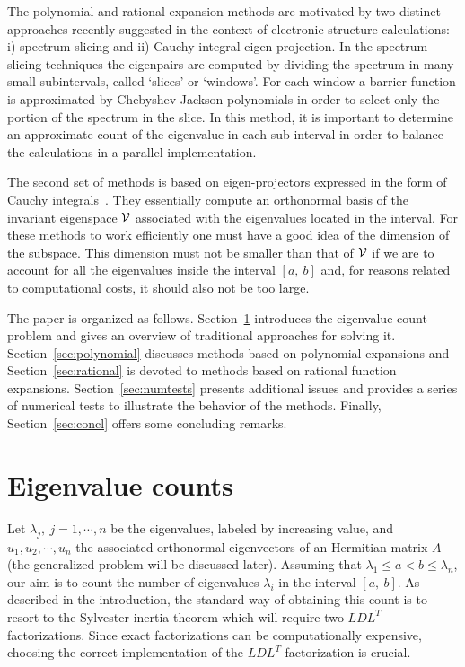 \documentclass[12pt]{article}		\usepackage{tabls,multirow}
\newcommand{\ab}{[a, \ b]}
\begin{document}
The polynomial and rational expansion methods are motivated by 
two distinct approaches recently suggested in the context of
electronic structure calculations: i) spectrum slicing and ii) Cauchy
integral eigen-projection. In the spectrum slicing techniques
\cite{Schofield-al-2011} the eigenpairs are computed by dividing the
spectrum in many small subintervals, called `slices' or `windows'.
For each window a barrier function is approximated by
Chebyshev-Jackson polynomials in order to select only the portion of
the spectrum in the slice. In this method, it is important to
determine an approximate count of the eigenvalue in each sub-interval
in order to balance the calculations in a parallel
implementation. 

The second set of methods is based on eigen-projectors
expressed in the form of Cauchy integrals~\cite{FEAST,SakSig03}.
They essentially compute an orthonormal basis of the invariant
eigenspace ${\cal V}$ associated with the eigenvalues located in the
interval. For these methods to work efficiently one must have a good
idea of the dimension of the subspace. This dimension must not be
smaller than that of ${\cal V}$ if we are to account for all the
eigenvalues inside the interval $\ab$ and, for reasons related to
computational costs, it should also not be too large.  


The paper is organized as follows.
Section~\ref{sec:eigcount} introduces the eigenvalue count problem
and gives an overview of traditional approaches for solving it.
Section~\ref{sec:polynomial} discusses methods based on
polynomial expansions and 
Section~\ref{sec:rational} is devoted to methods based on
rational function expansions. Section~\ref{sec:numtests} 
presents additional issues and provides a series of numerical
tests to illustrate the behavior of  the methods.
Finally, Section~\ref{sec:concl} offers some concluding remarks. 


\section{Eigenvalue counts}
\label{sec:eigcount}
Let $\lambda_j,\ j=1,\cdots,n$ be the eigenvalues, labeled by
increasing value, and $u_1, u_2, \cdots, u_n$ the associated
orthonormal eigenvectors of an Hermitian matrix $A$ (the generalized
problem will be discussed later). Assuming that $\lambda_1 \le a < b
\le \lambda_n$, our aim is to count the number of eigenvalues
$\lambda_i$ in the interval $\ab$. As described in the introduction,
the standard way of obtaining this count is to resort to the Sylvester
inertia theorem which will require two $LDL^T$ factorizations. Since
exact factorizations can be computationally expensive, choosing the
correct implementation of the $LDL^T$ factorization is crucial.
\end{document}
